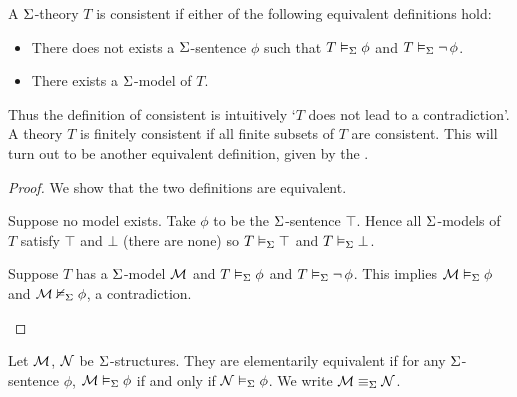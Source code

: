 \begin{dfn}
    A $\Sigma$-theory $T$ is consistent if either of the following equivalent
    definitions hold:
    \begin{itemize}
        \item
            There does not exists a
            $\Sigma$-sentence $\phi$ such that
            $T \vDash_{\Sigma} \phi$ and $T \vDash_{\Sigma} \neg\, \phi$.
        \item There exists
            a $\Sigma$-model of $T$.
    \end{itemize}
    Thus the definition of consistent is intuitively
    `$T$ does not lead to a contradiction'.
    A theory $T$ is finitely consistent if all
    finite subsets of $T$ are consistent.
    This will turn out to be another equivalent definition,
    given by the .
\end{dfn}
\begin{proof}
    We show that the two definitions are equivalent.
    \begin{forward}
        Suppose no model exists.
        Take $\phi$ to be the $\Sigma$-sentence $\top$.
        Hence all $\Sigma$-models of $T$ satisfy $\top$ and $\bot$
        (there are none) so
        $T \vDash_{\Sigma} \top$ and $T \vDash_{\Sigma} \bot$.
    \end{forward}
    \begin{backward}
        Suppose $T$ has a $\Sigma$-model $\mathcal{M}$
        and $T \vDash_{\Sigma} \phi$ and $T \vDash_{\Sigma} \neg\, \phi$.
        This implies $\mathcal{M} \vDash_{\Sigma} \phi$ and $\mathcal{M} \nvDash_{\Sigma} \phi$,
        a contradiction.
    \end{backward}
\end{proof}

\begin{dfn}
    Let $\mathcal{M}$, $\mathcal{N}$ be $\Sigma$-structures.
    They are elementarily equivalent if for any $\Sigma$-sentence $\phi$,
    $\mathcal{M} \vDash_{\Sigma} \phi$ if and only if $\mathcal{N} \vDash_{\Sigma} \phi$.
    We write $\mathcal{M} \equiv_\Sigma \mathcal{N}$.
\end{dfn}

